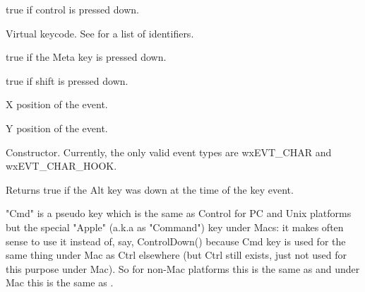 true if control is pressed down.


\label{wxkeyeventmkeycode}


Virtual keycode. See  for a list of identifiers.


\label{wxkeyeventmmetadown}


true if the Meta key is pressed down.


\label{wxkeyeventmshiftdown}


true if shift is pressed down.


\label{wxkeyeventmx}


X position of the event.


\label{wxkeyeventmy}


Y position of the event.


\label{wxkeyeventctor}


Constructor. Currently, the only valid event types are wxEVT\_CHAR and wxEVT\_CHAR\_HOOK.


\label{wxkeyeventaltdown}


Returns true if the Alt key was down at the time of the key event.


\label{wxkeyeventcmddown}


"Cmd" is a pseudo key which is the same as Control for PC and Unix platforms
but the special "Apple" (a.k.a as "Command") key under Macs: it makes often
sense to use it instead of, say, ControlDown() because Cmd key is used for the
same thing under Mac as Ctrl elsewhere (but Ctrl still exists, just not used
for this purpose under Mac). So for non-Mac platforms this is the same as 
 and under Mac this is the same
as .


